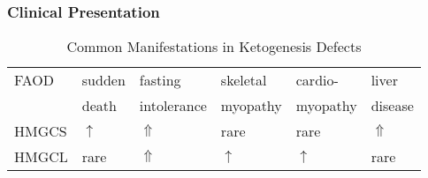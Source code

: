 \documentclass[12pt]{scrartcl}
\begin{document}
\subsubsection{Clinical Presentation}
\label{sec:org4bb5392}
\begin{table}[htbp]
\caption{\label{tab:org2ce7cda}Common Manifestations in Ketogenesis Defects}
\centering
\begin{tabular}{llllll}
FAOD & sudden & fasting & skeletal & cardio- & liver\\
 & death & intolerance & myopathy & myopathy & disease\\
\hline
HMGCS & \(\uparrow\) & \(\Uparrow\) & rare & rare & \(\Uparrow\)\\
HMGCL & rare & \(\Uparrow\) & \(\uparrow\) & \(\uparrow\) & rare\\
\end{tabular}
\end{table}
\end{document}
